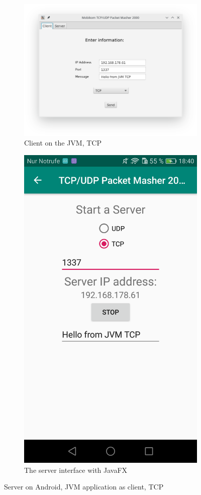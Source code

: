 \begin{figure}[H]
	\centering
	\begin{subfigure}{.49\textwidth}
		\centering
		\includegraphics[width=1\linewidth]{images/task3/subtask2/clientTCPNEW.png}
		\caption{Client on the JVM, TCP}
	\end{subfigure}
	\begin{subfigure}{.49\textwidth}
		\centering
		\includegraphics[width=0.74\linewidth]{images/task3/subtask2/android/serverTCP.png}
		\caption{The server interface with JavaFX}
	\end{subfigure}%
	\caption{Server on Android, JVM application as client, TCP}
	\label{fig:androidServerTCP}
\end{figure}


